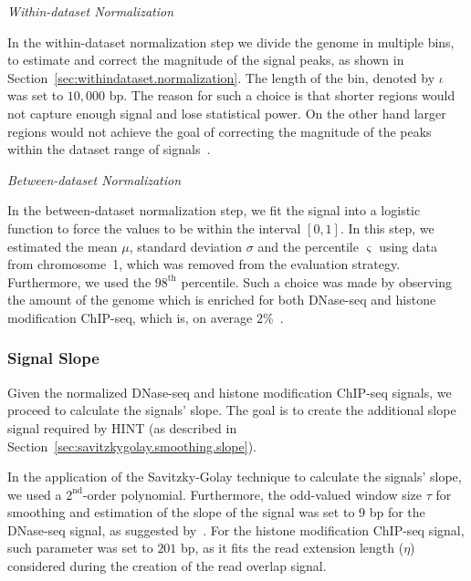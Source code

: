\vspace{0.5cm}
\noindent
\emph{Within-dataset Normalization}
\vspace{0.3cm}

In the within-dataset normalization step we divide the genome in multiple bins, to estimate and correct the magnitude of the signal peaks, as shown in Section~\ref{sec:withindataset.normalization}. The length of the bin, denoted by $\iota$ was set to $10,000$ bp. The reason for such a choice is that shorter regions would not capture enough signal and lose statistical power. On the other hand larger regions would not achieve the goal of correcting the magnitude of the peaks within the dataset range of signals~\citep{gusmao2014}.

\vspace{0.5cm}
\noindent
\emph{Between-dataset Normalization}
\vspace{0.3cm}

In the between-dataset normalization step, we fit the signal into a logistic function to force the values to be within the interval $[0,1]$. In this step, we estimated the mean $\mu$, standard deviation $\sigma$ and the percentile $\varsigma$ using data from chromosome~1, which was removed from the evaluation strategy. Furthermore, we used the $98^\text{th}$ percentile. Such a choice was made by observing the amount of the genome which is enriched for both DNase-seq and histone modification ChIP-seq, which is, on average \approxy$2\%$~\citep{gusmao2014}.

\subsubsection{Signal Slope}

Given the normalized DNase-seq and histone modification ChIP-seq signals, we proceed to calculate the signals' slope. The goal is to create the additional slope signal required by HINT (as described in Section~\ref{sec:savitzkygolay.smoothing.slope}).

In the application of the Savitzky-Golay technique to calculate the signals' slope, we used a $2^{\text{nd}}$-order polynomial. Furthermore, the odd-valued window size $\tau$ for smoothing and estimation of the slope of the signal was set to $9$ bp for the DNase-seq signal, as suggested by~\cite{boyle2011}. For the histone modification ChIP-seq signal, such parameter was set to $201$ bp, as it fits the read extension length ($\eta$) considered during the creation of the read overlap signal.

